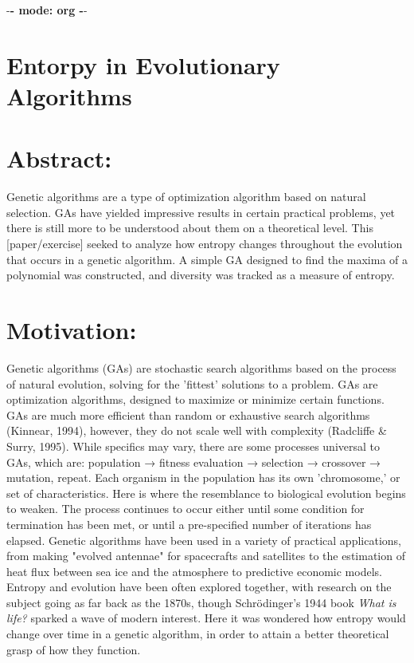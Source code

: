 \documentclass[11pt]{article}
\date{\today}
\title{}
\begin{document}
\tableofcontents

-\textbf{- mode: org -}-

\section{Entorpy in Evolutionary Algorithms}
\label{sec:org26f53e0}
\section{Abstract:}
\label{sec:orga17da23}
Genetic algorithms are a type of optimization algorithm based on natural selection. GAs have yielded impressive results in certain practical problems, yet there is still more to be understood about them on a theoretical level. This [paper/exercise] seeked to analyze how entropy changes throughout the evolution that occurs in a genetic algorithm. A simple GA designed to find the maxima of a polynomial was constructed, and diversity was tracked as a measure of entropy.

\section{Motivation:}
\label{sec:org16abecd}
Genetic algorithms (GAs) are stochastic search algorithms based on the process of natural evolution, solving for the 'fittest' solutions to a problem. GAs are optimization algorithms, designed to maximize or minimize certain functions. GAs are much more efficient than random or exhaustive search algorithms (Kinnear, 1994), however, they do not scale well with complexity (Radcliffe \& Surry, 1995). While specifics may vary, there are some processes universal to GAs, which are: population → fitness evaluation → selection → crossover → mutation, repeat. Each organism in the population has its own 'chromosome,' or set of characteristics. Here is where the resemblance to biological evolution begins to weaken. The process continues to occur either until some condition for termination has been met, or until a pre-specified number of iterations has elapsed. Genetic algorithms have been used in a variety of practical applications, from making "evolved antennae" for spacecrafts and satellites to the estimation of heat flux between sea ice and the atmosphere to predictive economic models. Entropy and evolution have been often explored together, with research on the subject going as far back as the 1870s, though Schrödinger's 1944 book \emph{What is life?} sparked a wave of modern interest. Here it was wondered how entropy would change over time in a genetic algorithm, in order to attain a better theoretical grasp of how they function.
\end{document}
